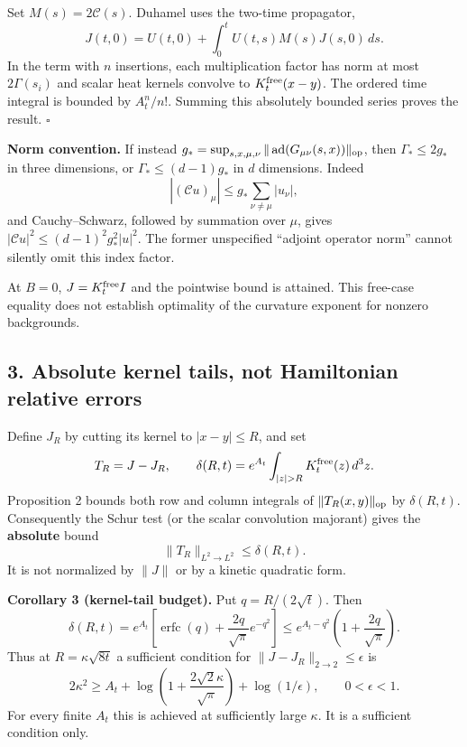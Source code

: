 \documentclass[11pt,a4paper]{article}
\begin{document}
Set \(M(s)=2\mathcal C(s)\). Duhamel uses the two-time propagator,
\[J(t,0)=U(t,0)+\int_0^t U(t,s)M(s)J(s,0)\,ds.\] In the term with \(n\)
insertions, each multiplication factor has norm at most \(2\Gamma(s_i)\)
and scalar heat kernels convolve to \(K_t^{\rm free}(x-y)\). The ordered
time integral is bounded by \(A_t^n/n!\). Summing this absolutely
bounded series proves the result. \(\square\)

\textbf{Norm convention.} If instead
\(g_*=\sup_{s,x,\mu,\nu}\|\operatorname{ad}(G_{\mu\nu}(s,x))\|_{\rm op}\),
then \(\Gamma_*\le2g_*\) in three dimensions, or \(\Gamma_*\le(d-1)g_*\)
in \(d\) dimensions. Indeed
\[|(\mathcal Cu)_\mu|\le g_*\sum_{\nu\ne\mu}|u_\nu|,\] and
Cauchy--Schwarz, followed by summation over \(\mu\), gives
\(|\mathcal Cu|^2\le(d-1)^2g_*^2|u|^2\). The former unspecified
``adjoint operator norm'' cannot silently omit this index factor.

At \(B=0\), \(J=K_t^{\rm free}I\) and the pointwise bound is attained.
This free-case equality does not establish optimality of the curvature
exponent for nonzero backgrounds.

\hypertarget{absolute-kernel-tails-not-hamiltonian-relative-errors}{%
\subsection{3. Absolute kernel tails, not Hamiltonian relative
errors}\label{absolute-kernel-tails-not-hamiltonian-relative-errors}}

Define \(J_R\) by cutting its kernel to \(|x-y|\le R\), and set
\[T_R=J-J_R,\qquad
\delta(R,t)=e^{A_t}\int_{|z|>R}K_t^{\rm free}(z)\,d^3z.\] Proposition 2
bounds both row and column integrals of \(\|T_R(x,y)\|_{\rm op}\) by
\(\delta(R,t)\). Consequently the Schur test (or the scalar convolution
majorant) gives the \textbf{absolute} bound
\[\|T_R\|_{L^2\to L^2}\le\delta(R,t).\] It is not normalized by
\(\|J\|\) or by a kinetic quadratic form.

\textbf{Corollary 3 (kernel-tail budget).} Put \(q=R/(2\sqrt t)\). Then
\[\delta(R,t)=e^{A_t}
\left[\operatorname{erfc}(q)+\frac{2q}{\sqrt\pi}e^{-q^2}\right]
\le e^{A_t-q^2}\left(1+\frac{2q}{\sqrt\pi}\right).\] Thus at
\(R=\kappa\sqrt{8t}\) a sufficient condition for
\(\|J-J_R\|_{2\to2}\le\epsilon\) is \[2\kappa^2\ge A_t+
\log\left(1+\frac{2\sqrt2\kappa}{\sqrt\pi}\right)
+\log(1/\epsilon),\qquad 0<\epsilon<1.\] For every finite \(A_t\) this
is achieved at sufficiently large \(\kappa\). It is a sufficient
condition only.
\end{document}
